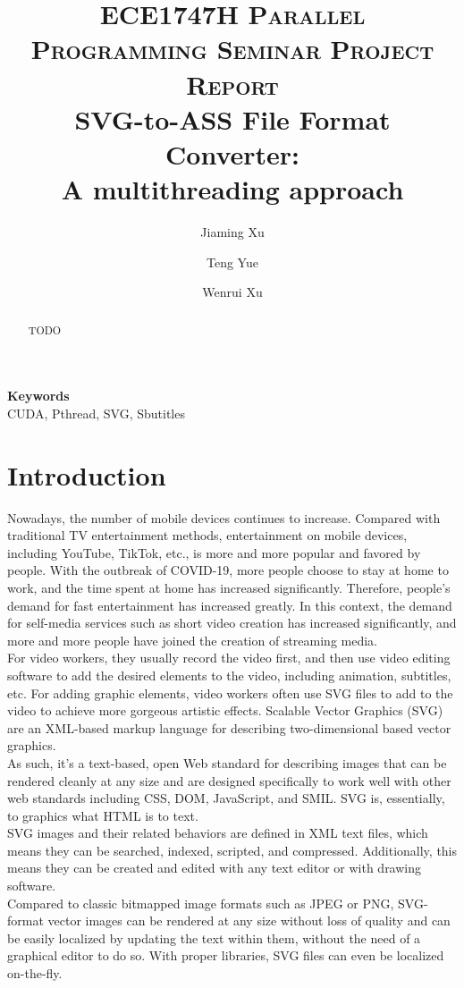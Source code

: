 \documentclass[10pt,twocolumn,letterpaper]{article}
\title{
		\usefont{OT1}{bch}{b}{n}
		\normalfont \normalsize \textsc{ECE1747H Parallel Programming Seminar Project Report} \\ [10pt]
		\huge SVG-to-ASS File Format Converter: \\ A multithreading approach \\
}
\author[1]{Jiaming Xu}
\author[2]{Teng Yue}
\author[1]{Wenrui Xu}
\affil[1]{\small{1007698831, Department of Electrical \& Computer Engineering, University of Toronto}}
\affil[2]{1007826792, Department of Electrical \& Computer Engineering, University of Toronto}
\affil[3]{1008313228, Department of Electrical \& Computer Engineering, University of Toronto}
\begin{document}
\maketitle

\begin{abstract}

TODO


\end{abstract}

{\textbf{Keywords} \\
CUDA, Pthread, SVG, Sbutitles}

\section{Introduction}

Nowadays, the number of mobile devices continues to increase. Compared with traditional TV entertainment methods, entertainment on mobile devices, including YouTube, TikTok, etc., is more and more popular and favored by people. With the outbreak of COVID-19, more people choose to stay at home to work, and the time spent at home has increased significantly. Therefore, people's demand for fast entertainment has increased greatly. In this context, the demand for self-media services such as short video creation has increased significantly, and more and more people have joined the creation of streaming media. \\
For video workers, they usually record the video first, and then use video editing software to add the desired elements to the video, including animation, subtitles, etc. For adding graphic elements, video workers often use SVG files to add to the video to achieve more gorgeous artistic effects.
Scalable Vector Graphics (SVG) are an XML-based markup language for describing two-dimensional based vector graphics. \\
As such, it's a text-based, open Web standard for describing images that can be rendered cleanly at any size and are designed specifically to work well with other web standards including CSS, DOM, JavaScript, and SMIL. SVG is, essentially, to graphics what HTML is to text. \\
SVG images and their related behaviors are defined in XML text files, which means they can be searched, indexed, scripted, and compressed. Additionally, this means they can be created and edited with any text editor or with drawing software. \\
Compared to classic bitmapped image formats such as JPEG or PNG, SVG-format vector images can be rendered at any size without loss of quality and can be easily localized by updating the text within them, without the need of a graphical editor to do so. With proper libraries, SVG files can even be localized on-the-fly. \\
\end{document}
